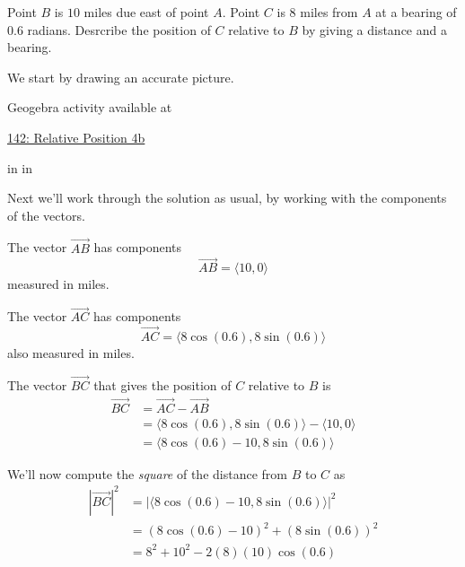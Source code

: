 \documentclass{ximera}
\newcommand{\pskip}{\vskip 0.1 in}
\begin{document}
 \begin{example}  \label{Exergt43tgr}
Point $B$ is $10$ miles due east of point $A$. Point $C$ is $8$ miles from $A$ at a bearing of $0.6$ radians. Desrcribe the position of $C$ relative to $B$ by giving a distance and a bearing.

\begin{explanation}
We start by drawing an accurate picture.

 
\begin{onlineOnly}
    \begin{center}
\end{center}
\end{onlineOnly}


Geogebra activity available at

\href{https://www.geogebra.org/classic/vsdrcnqm}{142: Relative Position 4b}


\pskip \pskip

Next we'll work through the solution as usual, by working with the components of the vectors.

The vector $\overrightarrow{AB}$ has components
\[
   \overrightarrow{AB} = \langle 10, 0  \rangle
\]
measured in miles.

The vector $\overrightarrow{AC}$ has components
\[
    \overrightarrow{AC} = \langle 8 \cos (0.6), 8 \sin(0.6)  \rangle
\]
also measured in miles.

The vector $\overrightarrow{BC}$ that gives the position of $C$ relative to $B$ is
\begin{align*}
       \overrightarrow{BC} &= \overrightarrow{AC} - \overrightarrow{AB}    \\
                                    &= \langle 8 \cos (0.6), 8 \sin(0.6)  \rangle - \langle 10, 0  \rangle \\
                                    &= \langle 8 \cos (0.6) - 10, 8 \sin(0.6)  \rangle
\end{align*}

We'll now compute the \emph{square} of the distance from $B$ to $C$ as
\begin{align*}
         |  \overrightarrow{BC} |^2 &= |    \langle 8 \cos (0.6) - 10, 8 \sin(0.6)  \rangle    |^2  \\
                                             &= (8 \cos (0.6) - 10)^2 + (8 \sin(0.6))^2   \\
                                             &=  8^2 + 10^2 - 2(8)(10) \cos(0.6)
\end{align*}


\end{explanation}
\end{example}
\end{document}
